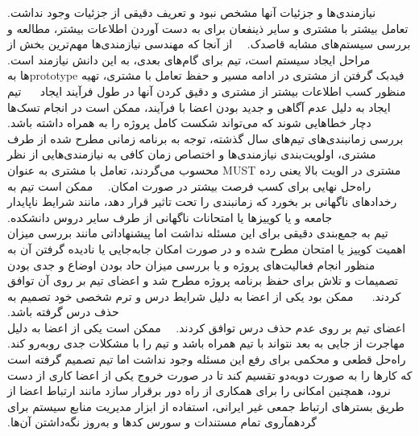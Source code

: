 ‫
‫
‫
‫
‫ نیازمندی‌ها و جزئیات آنها مشخص نبود و تعریف دقیقی از جزئیات وجود نداشت.
‫\\
‫ تعامل بیشتر با مشتری و سایر‌ ذینفعان برای به دست آوردن اطلاعات بیشتر، مطالعه و بررسی سیستم‌های مشابه قاصدک.
‫
‫
‫ از آنجا که مهندسی نیازمندی‌ها مهم‌ترین بخش از مراحل ایجاد سیستم است، تیم برای گام‌های بعدی، به این دانش نیازمند است.
‫\\
‫ فیدبک گرفتن از مشتری در ادامه‌ مسیر و حفظ تعامل با مشتری، تهیه prototypeها به منظور کسب اطلاعات بیشتر از مشتری و دقیق کردن آنها در طول فرآیند ایجاد
‫
‫
‫
‫ تیم ایجاد به دلیل عدم آگاهی و جدید بودن اعضا با فرآیند، ممکن است در انجام تسک‌ها دچار خطاهایی شوند که می‌تواند شکست کامل پروژه را به همراه داشته باشد.
‫\\
‫ بررسی زمانبندی‌های تیم‌های سال گذشته، توجه به برنامه زمانی مطرح شده از طرف مشتری، اولویت‌بندی نیازمندی‌ها و اختصاص زمان کافی به نیازمندی‌هایی از نظر مشتری در الویت بالا یعنی رده MUST محسوب می‌گردند، تعامل با مشتری به عنوان راه‌حل نهایی برای کسب فرصت بیشتر در صورت امکان.
‫
‫
‫ ممکن است تیم به رخدادهای ناگهانی بر بخورد که زمانبندی را تحت تاثیر قرار دهد، مانند شرایط ناپایدار جامعه و یا کوییزها یا امتحانات ناگهانی از طرف سایر دروس دانشکده.
‫\\
‫ تیم به جمع‌بندی دقیقی برای این مسئله نداشت اما پیشنهاداتی مانند بررسی میزان اهمیت کوییز یا امتحان مطرح شده و در صورت امکان جابه‌جایی یا نادیده‌ گرفتن آن به منظور انجام فعالیت‌های پروژه و یا بررسی میزان حاد بودن اوضاع و جدی بودن تصمیمات و تلاش برای حفظ برنامه‌ پروژه مطرح شد و اعضای تیم بر روی آن توافق کردند.
‫
‫
‫
‫ ممکن بود یکی از اعضا به دلیل شرایط درس و ترم شخصی خود تصمیم به حذف درس گرفته باشد.
‫\\
‫ اعضای تیم بر روی عدم حذف درس توافق کردند.
‫
‫
‫ ممکن است یکی از اعضا به دلیل مهاجرت از جایی به بعد نتواند با تیم همراه باشد و تیم را با مشکلات جدی رو‌به‌رو کند.
‫\\
‫ راه‌حل قطعی و محکمی برای رفع این مسئله وجود نداشت اما تیم تصمیم گرفته است که کارها را به صورت دوبه‌دو تقسیم کند تا در صورت خروج یکی از اعضا کاری از دست نرود، همچنین امکانی را برای همکاری از راه دور برقرار سازد مانند ارتباط اعضا از طریق بسترهای ارتباط‌ جمعی غیر ایرانی، استفاده از ابزار مدیریت منابع سیستم برای گردهمآروی تمام مستندات و سورس کدها و به‌روز نگه‌داشتن آن‌ها.
